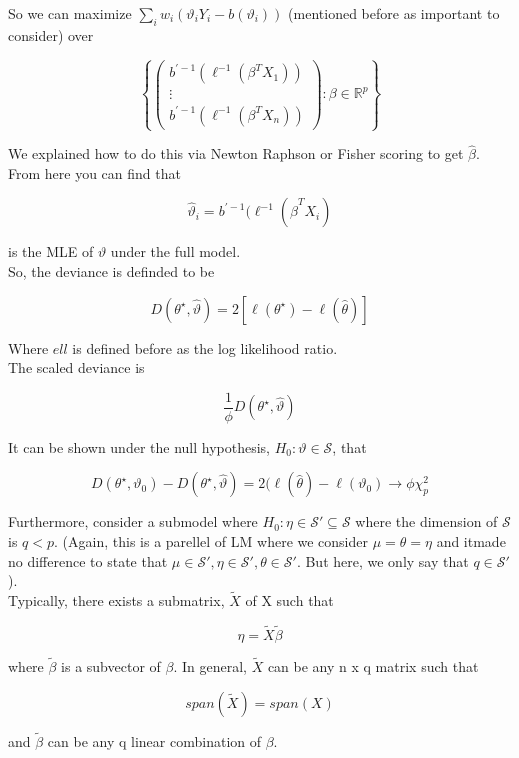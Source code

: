 \documentclass[11pt,fleqn]{book} %
\begin{document}
So we can maximize $\sum_i w_i (\vartheta_i Y_i - b(\vartheta_i)) $ (mentioned before as important to consider) over 

		$$\left\{ \begin{pmatrix}
			b^{'-1}(\ell^{-1}(\beta^T X_1))\\
			\vdots\\
			b^{'-1}(\ell^{-1}(\beta^T X_n))
		\end{pmatrix} : \beta \in \mathbb{R}^p \right\} $$

We explained how to do this via Newton Raphson or Fisher scoring to get $\hat{\beta}$. From here you can find that

		$$\hat{\vartheta}_i = b^{'-1}(\ell^{-1}(\hat{\beta}^T X_i) $$

is the MLE of $\vartheta$ under the full model. \\

So, the deviance is definded to be 
	
		$$D(\theta^\star, \hat{\vartheta}) = 2[\ell(\theta^\star) - \ell(\hat{\theta})] $$

Where $ell$ is defined before as the log likelihood ratio. \\

The scaled deviance is 
		
		$$\frac{1}{\phi} D(\theta^\star, \hat{\vartheta}) $$

It can be shown under the null hypothesis, $H_0: \vartheta \in \mathcal{S}$, that 

		$$D(\theta^\star, {\vartheta_0}) - D(\theta^\star, \hat{\vartheta}) = 2(\ell(\hat{\theta}) - \ell(\vartheta_0) \rightarrow \phi \chi^2_p$$

Furthermore, consider a submodel where $H_0: \eta \in \mathcal{S}' \subseteq \mathcal{S}$ where the dimension of $\mathcal{S}$ is $q < p$. (Again, this is a parellel of LM where we consider $\mu = \theta = \eta$ and itmade no difference to state that $\mu \in \mathcal{S}', \eta \in \mathcal{S}', \theta \in \mathcal{S}'$. But here, we only say that $q \in \mathcal{S}'$).\\

Typically, there exists a submatrix, $\tilde{X}$ of X such that 

		$$ \eta = \tilde{X} \tilde{\beta} $$

where $\tilde{\beta}$ is a subvector of $\beta$. In general, $\tilde{X}$ can be any n x q matrix such that 

	$$span(\tilde{X}) = span(X) $$

and $\tilde{\beta}$ can be any q linear combination of $\beta$. \\
\end{document}
